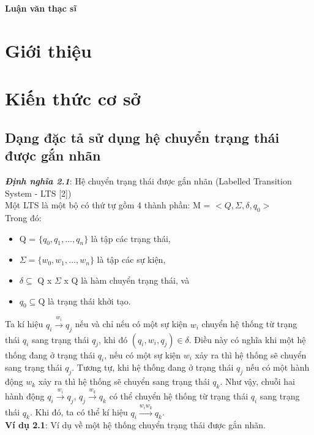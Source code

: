 \documentclass[a4paper,13pt,oneside,openany]{book}
\begin{document}
	\begin{center}
		\textbf{\large Luận văn thạc sĩ}
	\end{center}
	\begin{flushleft}
	\chapter{Giới thiệu}
	\chapter{Kiến thức cơ sở}
		\section{Dạng đặc tả sử dụng hệ chuyển trạng thái được gắn nhãn}
		\justify
		\textbf{\textit{Định nghĩa 2.1}}: Hệ chuyển trạng thái được gắn nhãn (Labelled Transition System - LTS [2])\\
		Một LTS là một bộ có thứ tự gồm 4 thành phần: M = $<Q, \Sigma, \delta, q_{0}>$\\
		Trong đó:\\
		\begin{itemize}
			\item Q = $\{q_{0}, q_{1}, ..., q_{n}\}$ là tập các trạng thái,
			\item $\Sigma = \{w_{0}, w_{1}, ..., w_n\}$ là tập các sự kiện,
			\item $\delta \subseteq$ Q x $\Sigma$ x Q là hàm chuyển trạng thái, và
			\item $q_{0} \subseteq \textrm{Q}$ là trạng thái khởi tạo.\\
		\end{itemize}
		Ta kí hiệu $q_i \overset{w_i}{\longrightarrow} q_{j}$ nếu và chỉ nếu có một sự kiện $w_i$ chuyển hệ thống từ trạng thái $q_i$ sang trạng thái $q_j$, khi đó $(q_i, w_i, q_j) \in \delta$. Điều này có nghĩa khi một hệ thống đang ở trạng thái $q_i$, nếu có một sự kiện $w_i$ xảy ra thì hệ thống sẽ chuyển sang trạng thái $q_j$. Tương tự, khi hệ thống đang ở trạng thái $q_j$ nếu có một hành động $w_k$ xảy ra thì hệ thống sẽ chuyển sang trạng thái $q_k$. Như vậy, chuỗi hai hành động  $q_i \overset{w_i}{\longrightarrow} q_j$,  $q_j \overset{w_k}{\longrightarrow} q_k$ có thể chuyển hệ thống từ trạng thái $q_i$ sang trạng thái $q_k$. Khi đó, ta có thể kí hiệu  $q_i \overset{w_iw_k}{\longrightarrow} q_{k}$.\\
		\textbf{Ví dụ 2.1}: Ví dụ về một hệ thống chuyển trạng thái được gắn nhãn.\\
		\begin{figure}[h]

\end{figure}
\end{flushleft}
\end{document}
